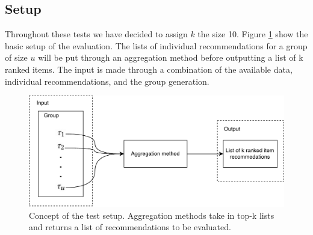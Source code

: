 \subsection{Setup}\label{sec:setup}
Throughout these tests we have decided to assign $k$ the size 10. Figure \ref{fig:setup} show the basic setup of the evaluation. The lists of individual recommendations for a group of size $u$ will be put through an aggregation method before outputting a list of k ranked items. The input is made through a combination of the available data, individual recommendations, and the group generation.

\begin{figure}[h]
	\centering
	\includegraphics[scale=.4]{graphics/setup}
	\caption{Concept of the test setup. Aggregation methods take in top-k lists and returns a list of recommendations to be evaluated.}
	\label{fig:setup}
\end{figure}





